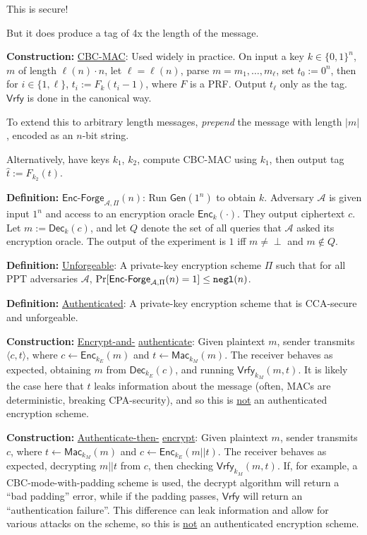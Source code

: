 \documentclass[10pt]{article}
\newcommand{\AAA}{\mathcal{A}}
\newcommand{\defn}[1]{{\bf Definition:} \underline{#1}}
\newcommand{\con}[1]{{\bf Construction:} \underline{#1}}
\newcommand{\Enc}{\mathsf{Enc}}
\newcommand{\Dec}{\mathsf{Dec}}
\newcommand{\Mac}{\mathsf{Mac}}
\newcommand{\Vrfy}{\mathsf{Vrfy}}
\newcommand{\Gen}{\mathsf{Gen}}
\newcommand{\ang}[1]{\langle#1\rangle}
\newcommand{\ExptEncfArgs}[2]{\mathsf{Enc\text{-}Forge}_{#1,#2}}
\newcommand{\ExptEncf}{\ExptEncfArgs{\AAA}{\Pi}}
\newcommand{\negl}{{\tt negl}}
\newcommand{\from}{\leftarrow}
\begin{document}
\begin{multicols}{4}
This is secure!

But it does produce a tag of 4x the length of the message.

\con{CBC-MAC}: Used widely in practice. On input a key $k\in\{0,1\}^n$, $m$ of length $\ell(n)\cdot n$, let $\ell=\ell(n)$, parse $m=m_1,\dots,m_\ell$, set $t_0:=0^n$, then for $i\in\{1,\ell\}$, $t_i:=F_k(t_i-1)$, where $F$ is a PRF. Output $t_\ell$ only as the tag. $\Vrfy$ is done in the canonical way.

To extend this to arbitrary length messages, {\it prepend} the message with length $|m|$, encoded as an $n$-bit string.

Alternatively, have keys $k_1$, $k_2$, compute CBC-MAC using $k_1$, then output tag $\hat{t}:=F_{k_2}(t)$.

\defn{$\ExptEncf(n)$}: Run $\Gen(1^n)$ to obtain $k$. Adversary $\AAA$ is given input $1^n$ and access to an encryption oracle $\Enc_k(\cdot)$. They output ciphertext $c$. Let $m:=\Dec_k(c)$, and let $Q$ denote the set of all queries that $\AAA$ asked its encryption oracle. The output of the experiment is $1$ iff $m\neq\perp$ and $m\not\in Q$.

\defn{Unforgeable}: A private-key encryption scheme $\Pi$ such that for all PPT adversaries $\AAA$, $\Pr[\ExptEncf(n)=1]\leq\negl(n)$.

\defn{Authenticated}: A private-key encryption scheme that is CCA-secure and unforgeable.

\con{Encrypt-and-} \underline{authenticate}: Given plaintext $m$, sender transmits $\ang{c,t}$, where $c\from\Enc_{k_E}(m)$ and $t\from\Mac_{k_M}(m)$. The receiver behaves as expected, obtaining $m$ from $\Dec_{k_E}(c)$, and running $\Vrfy_{k_M}(m,t)$. It is likely the case here that $t$ leaks information about the message (often, MACs are deterministic, breaking CPA-security), and so this is \underline{not} an authenticated encryption scheme.

\con{Authenticate-then-} \underline{encrypt}: Given plaintext $m$, sender transmits $c$, where $t\from\Mac_{k_M}(m)$ and $c\from\Enc_{k_E}(m||t)$. The receiver behaves as expected, decrypting $m||t$ from $c$, then checking $\Vrfy_{k_M}(m,t)$. If, for example, a CBC-mode-with-padding scheme is used, the decrypt algorithm will return a ``bad padding'' error, while if the padding passes, $\Vrfy$ will return an ``authentication failure''. This difference can leak information and allow for various attacks on the scheme, so this is \underline{not} an authenticated encryption scheme.


\end{multicols}
\end{document}

